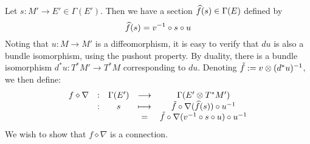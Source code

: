 \documentclass[./Thick_TQFTs_and_Quantum_Information.tex]{subfiles}
\begin{document}
Let $s : M' \to E' \in \Gamma(E')$. Then we have a section
$\widehat{f}(s) \in \Gamma(E)$ defined by
\[
  \widehat{f}(s) = v^{-1} \circ s \circ u
\]
Noting that $u : M \to M'$ is a diffeomorphism, it is easy to verify that $du$
is also a bundle isomorphism, using the pushout property. By duality, there is
a bundle isomorphism $d^*u : T^*M' \to T^*M$ corresponding to $du$. Denoting
$\tilde{f} := v \otimes (d^*u)^{-1}$, we then define:
\[\begin{array}{ccccc}
f \diamond \nabla
&:& \Gamma(E') &\stackrel{}{\longrightarrow}    & \Gamma(E' \otimes T^*M') \\
&:& s &\longmapsto& \tilde{f} \circ \nabla(\widehat{f}(s)) \circ u^{-1} \\
&&& = &
  \tilde{f} \circ \nabla(v^{-1} \circ s \circ u) \circ u^{-1}
\end{array}\]
We wish to show that $f \diamond \nabla$ is a connection.
\end{document}
